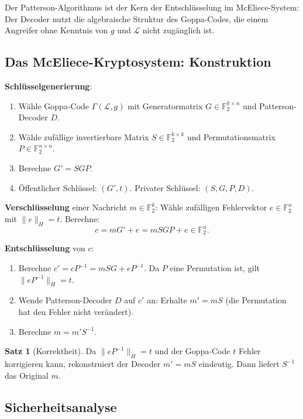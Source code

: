 ﻿\documentclass[a4paper,12pt]{scrreprt}
\theoremstyle{definition}
\newtheorem{satz}{Satz}[section]
\begin{document}
Der Patterson-Algorithmus ist der Kern der Entschlüsselung im McEliece-System: Der Decoder nutzt die algebraische Struktur des Goppa-Codes, die einem Angreifer ohne Kenntnis von $g$ und $\mathcal{L}$ nicht zugänglich ist.

\subsection{Das McEliece-Kryptosystem: Konstruktion}

\textbf{Schlüsselgenerierung}:
\begin{enumerate}
    \item Wähle Goppa-Code $\Gamma(\mathcal{L}, g)$ mit Generatormatrix $G \in \mathbb{F}_2^{k \times n}$ und Patterson-Decoder $D$.
    \item Wähle zufällige invertierbare Matrix $S \in \mathbb{F}_2^{k \times k}$ und Permutationsmatrix $P \in \mathbb{F}_2^{n \times n}$.
    \item Berechne $G' = S G P$.
    \item Öffentlicher Schlüssel: $(G', t)$. Privater Schlüssel: $(S, G, P, D)$.
\end{enumerate}

\textbf{Verschlüsselung} einer Nachricht $m \in \mathbb{F}_2^k$: Wähle zufälligen Fehlervektor $e \in \mathbb{F}_2^n$ mit $\|e\|_H = t$. Berechne:
\[
c = mG' + e = mSGP + e \in \mathbb{F}_2^n.
\]

\textbf{Entschlüsselung} von $c$:
\begin{enumerate}
    \item Berechne $c' = cP^{-1} = mSG + eP^{-1}$. Da $P$ eine Permutation ist, gilt $\|eP^{-1}\|_H = t$.
    \item Wende Patterson-Decoder $D$ auf $c'$ an: Erhalte $m' = mS$ (die Permutation hat den Fehler nicht verändert).
    \item Berechne $m = m' S^{-1}$.
\end{enumerate}

\begin{satz}[Korrektheit]
Da $\|eP^{-1}\|_H = t$ und der Goppa-Code $t$ Fehler korrigieren kann, rekonstruiert der Decoder $m' = mS$ eindeutig. Dann liefert $S^{-1}$ das Original $m$.
\end{satz}

\subsection{Sicherheitsanalyse}
\end{document}
